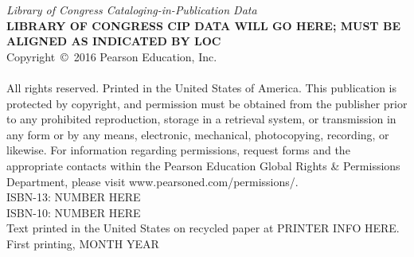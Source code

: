 {\noindent\textit{Library of Congress Cataloging-in-Publication Data}\\[.75ex]  %
\textbf{LIBRARY OF CONGRESS CIP DATA WILL GO HERE; MUST BE ALIGNED AS INDICATED BY LOC}\\[.75ex]
\noindent Copyright~\copyright~2016 Pearson Education, Inc.\\
\hspace{\fill}\\
\noindent All rights reserved. Printed in the United States of America. This publication is protected by copyright, and permission must be obtained from the publisher prior to any prohibited reproduction, storage in a retrieval system, or transmission in any form or by any means, electronic, mechanical, photocopying, recording, or likewise. For information regarding permissions, request forms and the appropriate contacts within the Pearson Education Global Rights \& Permissions Department, please visit www.pearsoned.com/permissions/.\\[.75ex]

\noindent ISBN-13: NUMBER HERE\\[-.5ex] %
\noindent ISBN-10: NUMBER HERE \\[-.5ex] %
\noindent Text printed in the United States on recycled paper at PRINTER INFO HERE.\\[-.5ex] %
\noindent First printing, MONTH YEAR %
}
